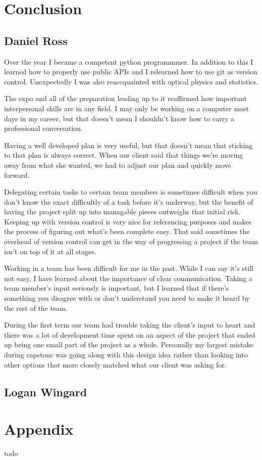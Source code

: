 \documentclass[onecolumn, draftclsnofoot,10pt, compsoc]{IEEEtran}
\begin{document}
\begin{singlespace}
	\section{Conclusion}
		\subsection{Daniel Ross}

			Over the year I became a competent python programmmer.
			In addition to this I learned how to properly use public APIs and I relearned how to use git as version control.
			Unexpectedly I was also reaccquainted with optical physics and statistics.

			The expo and all of the preparation leading up to it reaffirmed how important interpersonal skills are in any field.
			I may only be working on a computer most days in my career, but that doesn't mean I shouldn't know how to carry a professional conversation.

			Having a well developed plan is very useful, but that doesn't mean that sticking to that plan is always correct.
			When our client said that things we're moving away from what she wanted, we had to adjust our plan and quickly move forward.


			Delegating certain tasks to certain team members is sometimes difficult when you don't know the exact difficultly of a task before it's underway, but the benefit of having the project split up into managable pieces outweighs that initial risk.
			Keeping up with version control is very nice for referencing purposes and makes the process of figuring out what's been complete easy.
			That said sometimes the overhead of version control can get in the way of progressing a project if the team isn't on top of it at all stages.

			Working in a team has been difficult for me in the past.
			While I can say it's still not easy, I have learned about the importance of clear communication.
			Taking a team member's input seriously is important, but I learned that if there's something you disagree with or don't understand you need to make it heard by the rest of the team.

			During the first term our team had trouble taking the client's input to heart and there was a lot of development time spent on an aspect of the project that ended up being one small part of the project as a whole.
			Personally my largest mistake during capstone was going along with this design idea rather than looking into other options that more closely matched what our client was asking for.
		\subsection{Logan Wingard}\cite{neural}
	\section{Appendix}
		todo
\end{singlespace}
\clearpage


\end{document}

